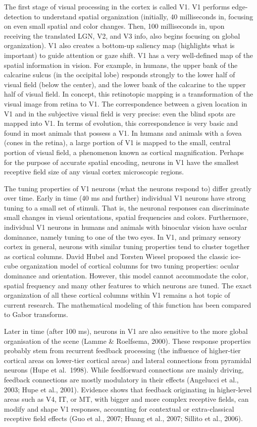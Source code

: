 \documentclass[]{book}
\begin{document}
The first stage of visual processing in the cortex is called V1. V1 performs edge-detection to understand spatial organization (initially, 40 milliseconds in, focusing on even small spatial and color changes. Then, 100 milliseconds in, upon receiving the translated LGN, V2, and V3 info, also begins focusing on global organization). V1 also creates a bottom-up saliency map (highlights what is important) to guide attention or gaze shift. V1 has a very well-defined map of the spatial information in vision. For example, in humans, the upper bank of the calcarine sulcus (in the occipital lobe) responds strongly to the lower half of visual field (below the center), and the lower bank of the calcarine to the upper half of visual field. In concept, this retinotopic mapping is a transformation of the visual image from retina to V1. The correspondence between a given location in V1 and in the subjective visual field is very precise: even the blind spots are mapped into V1. In terms of evolution, this correspondence is very basic and found in most animals that possess a V1. In humans and animals with a fovea (cones in the retina), a large portion of V1 is mapped to the small, central portion of visual field, a phenomenon known as cortical magnification. Perhaps for the purpose of accurate spatial encoding, neurons in V1 have the smallest receptive field size of any visual cortex microscopic regions.

The tuning properties of V1 neurons (what the neurons respond to) differ greatly over time. Early in time (40 ms and further) individual V1 neurons have strong tuning to a small set of stimuli. That is, the neuronal responses can discriminate small changes in visual orientations, spatial frequencies and colors. Furthermore, individual V1 neurons in humans and animals with binocular vision have ocular dominance, namely tuning to one of the two eyes. In V1, and primary sensory cortex in general, neurons with similar tuning properties tend to cluster together as cortical columns. David Hubel and Torsten Wiesel proposed the classic ice-cube organization model of cortical columns for two tuning properties: ocular dominance and orientation. However, this model cannot accommodate the color, spatial frequency and many other features to which neurons are tuned. The exact organization of all these cortical columns within V1 remains a hot topic of current research. The mathematical modeling of this function has been compared to Gabor transforms.

Later in time (after 100 ms), neurons in V1 are also sensitive to the more global organisation of the scene (Lamme \& Roelfsema, 2000). These response properties probably stem from recurrent feedback processing (the influence of higher-tier cortical areas on lower-tier cortical areas) and lateral connections from pyramidal neurons (Hupe et al.~1998). While feedforward connections are mainly driving, feedback connections are mostly modulatory in their effects (Angelucci et al., 2003; Hupe et al., 2001). Evidence shows that feedback originating in higher-level areas such as V4, IT, or MT, with bigger and more complex receptive fields, can modify and shape V1 responses, accounting for contextual or extra-classical receptive field effects (Guo et al., 2007; Huang et al., 2007; Sillito et al., 2006).
\end{document}
